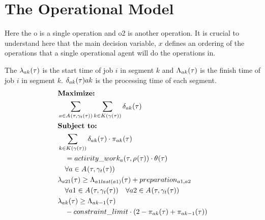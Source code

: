 \section{The Operational Model}

Here the o is a single operation and o2 is another operation. It is crucial to understand here that the main
decision variable, $x$ defines an ordering of the operations that a single operational agent will do the 
operations in. 

The $\lambda_{ak}(\tau)$ is the start time of job $i$ in segment $k$ and $\Lambda_{ak}(\tau)$ is the finish time of job $i$ in segment $k$.
$\delta_{ak}(\tau){a}{k}$ is the processing time of each segment. 
\begin{alignat}{2}
	& \textbf{Maximize:} \notag\\
	& \sum_{\ElementActivity \in \SetActivity{\VarSupervisorAssignment{}{\ElementTechnician}}{}} \sum_{\ElementWorkSegment \in \SetWorkSegment} \VarProcessingTime                                                         \\
	& \textbf{Subject to:} \notag                                                                                                                                       \\
    & \sum_{\ElementWorkSegment \in \SetWorkSegment} \VarProcessingTime \cdot \VarActiveSegment{\ElementActivity}{\ElementWorkSegment} \notag\\ 
	& \quad = \ParActivityWork{} \cdot \VarIncludeActivity \notag\\
	& \quad \forall \ElementActivity \in \SetActivity{\VarSupervisorAssignment{}{\ElementTechnician}}{} \\
	& \VarStartOfSegment{\ElementActivity2}{1} \geq \VarFinishOfSegment{\ElementActivity1}{last(\ElementActivity1)} + \ParPreparation \notag                                                                       \\ 
	& \quad \forall \ElementActivity1 \in \SetActivity{\VarSupervisorAssignment{}{\ElementTechnician}}{} \quad \forall \ElementActivity2 \in \SetActivity{\VarSupervisorAssignment{}{\ElementTechnician}}{}                                                     \\
	& \VarStartOfSegment{\ElementActivity}{\ElementWorkSegment} \geq \VarFinishOfSegment{\ElementActivity}{\ElementWorkSegment-1} \notag\\
	& \quad - \ParConstraintLimit \cdot (2 - \VarActiveSegment{\ElementActivity}{\ElementWorkSegment} + \VarActiveSegment{\ElementActivity}{\ElementWorkSegment-1})                \notag\\

\end{alignat}

